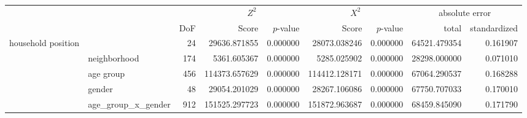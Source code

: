 \begin{tabular}{ll|r|rr|rr|rr}
\toprule
 &  &  & \multicolumn{2}{|c}{$Z^2$} & \multicolumn{2}{|c}{$X^2$} & \multicolumn{2}{|c}{absolute error} \\
 &  & DoF & Score & $p$-value & Score & $p$-value & total & standardized \\
\midrule
\multirow[t]{5}{*}{household position} &  & 24 & 29636.871855 & 0.000000 & 28073.038246 & 0.000000 & 64521.479354 & 0.161907 \\
 & neighborhood & 174 & 5361.605367 & 0.000000 & 5285.025902 & 0.000000 & 28298.000000 & 0.071010 \\
 & age group & 456 & 114373.657629 & 0.000000 & 114412.128171 & 0.000000 & 67064.290537 & 0.168288 \\
 & gender & 48 & 29054.201029 & 0.000000 & 28267.106086 & 0.000000 & 67750.707033 & 0.170010 \\
 & age_group_x_gender & 912 & 151525.297723 & 0.000000 & 151872.963687 & 0.000000 & 68459.845090 & 0.171790 \\
\cline{1-9}
\bottomrule
\end{tabular}
